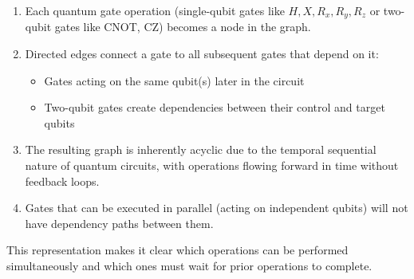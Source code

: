 \begin{enumerate}
  \item Each quantum gate operation (single-qubit gates like \(H, X, R_x,
    R_y, R_z\) or two-qubit gates like CNOT, CZ) becomes a node in the graph.

  \item Directed edges connect a gate to all subsequent gates that depend on it:

    \begin{itemize}
      \item Gates acting on the same qubit(s) later in the circuit

      \item Two-qubit gates create dependencies between their control and
        target qubits
    \end{itemize}

  \item The resulting graph is inherently acyclic due to the temporal
    sequential nature of quantum circuits, with operations flowing forward in
    time without feedback loops.

  \item Gates that can be executed in parallel (acting on independent qubits)
    will not have dependency paths between them.
\end{enumerate}

This representation makes it clear which operations can be performed
simultaneously and which ones must wait for prior operations to complete.



